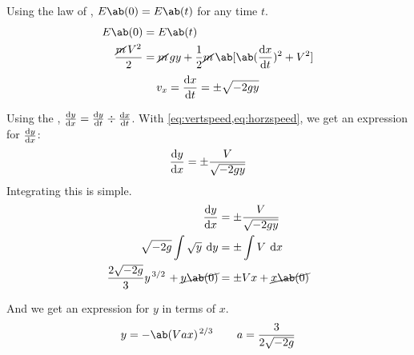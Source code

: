 Using the law of , \(E\ab(0) = E\ab(t)\)
for any time \(t\).
\begin{align*}
  E\ab(0) &= E\ab(t)\\
  \f{\cancel{m}\,V^2}{2} &= \cancel{m}\,gy +
  \f{1}{2}\cancel{m}\,\ab[\ab(\odv{x}{t})^2 + V^2]
\end{align*}
\begin{equation}
  \label{eq:horzspeed}
  v_x = \odv{x}{t} = \pm\sqrt{-2gy}
\end{equation}

Using the , \(\odv{y}{x} = \odv{y}{t}\div\odv{x}{t}\).
With \cref{eq:vertspeed,eq:horzspeed}, we get an expression for \(\odv{y}{x}\):
\begin{equation}
  \odv{y}{x} = \pm\f{V}{\sqrt{-2gy}}
\end{equation}
Integrating this is simple.
\begin{align*}
  \odv{y}{x} &= \pm\f{V}{\sqrt{-2gy}} \\
  \sqrt{-2g}\int\sqrt{y}\:\odif{y} &= \pm\int V\:\odif{x}  \\
  \f{2\sqrt{-2g}}{3}y^{\lf{3}{2}} + \cancel{y\ab(0)} &= \pm Vx +
  \cancel{x\ab(0)}
\end{align*}

And we get an expression for \(y\) in terms of \(x\).
\begin{equation}
  y = -\ab(Vax)^{\lf{2}{3}}\qquad a = \f{3}{2\sqrt{-2g}}
\end{equation}